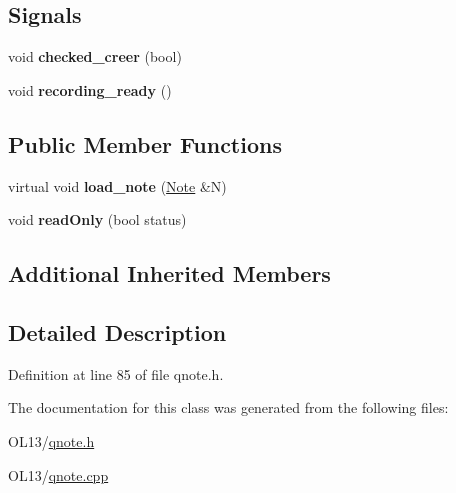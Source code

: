 \subsection*{Signals}
\begin{DoxyCompactItemize}
\item 
\mbox{\label{class_q_recording_a6a2b27ca530a1b1da1f97759c7742206}} 
void {\bfseries checked\+\_\+creer} (bool)
\item 
\mbox{\label{class_q_recording_aee0cf464a60e91f566bcff3d3caa3534}} 
void {\bfseries recording\+\_\+ready} ()
\end{DoxyCompactItemize}
\subsection*{Public Member Functions}
\begin{DoxyCompactItemize}
\item 
\mbox{\label{class_q_recording_aa6984351b5a0bceaa63be793b160c73b}} 
virtual void {\bfseries load\+\_\+note} (\hyperlink{class_note}{Note} \&N)
\item 
\mbox{\label{class_q_recording_a98fa21d8814450c0d912c8ce102ca832}} 
void {\bfseries read\+Only} (bool status)
\end{DoxyCompactItemize}
\subsection*{Additional Inherited Members}


\subsection{Detailed Description}


Definition at line 85 of file qnote.\+h.



The documentation for this class was generated from the following files\+:\begin{DoxyCompactItemize}
\item 
O\+L13/\hyperlink{qnote_8h}{qnote.\+h}\item 
O\+L13/\hyperlink{qnote_8cpp}{qnote.\+cpp}\end{DoxyCompactItemize}
